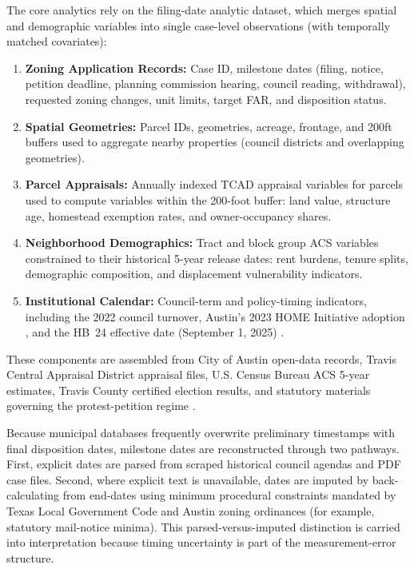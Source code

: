 \documentclass[11pt, letterpaper]{article}
\begin{document}
The core analytics rely on the filing-date analytic dataset, which merges spatial and demographic variables into single case-level observations (with temporally matched covariates):
\begin{enumerate}
    \item \textbf{Zoning Application Records:} Case ID, milestone dates (filing, notice, petition deadline, planning commission hearing, council reading, withdrawal), requested zoning changes, unit limits, target FAR, and disposition status.
    \item \textbf{Spatial Geometries:} Parcel IDs, geometries, acreage, frontage, and 200ft buffers used to aggregate nearby properties (council districts and overlapping geometries).
    \item \textbf{Parcel Appraisals:} Annually indexed TCAD appraisal variables for parcels used to compute variables within the 200-foot buffer: land value, structure age, homestead exemption rates, and owner-occupancy shares.
    \item \textbf{Neighborhood Demographics:} Tract and block group ACS variables constrained to their historical 5-year release dates: rent burdens, tenure splits, demographic composition, and displacement vulnerability indicators.
    \item \textbf{Institutional Calendar:} Council-term and policy-timing indicators, including the 2022 council turnover, Austin's 2023 HOME Initiative adoption \cite{pool2023}, and the HB~24 effective date (September 1, 2025) \cite{hb24_2025}.
\end{enumerate}

These components are assembled from City of Austin open-data records, Travis Central Appraisal District appraisal files, U.S. Census Bureau ACS 5-year estimates, Travis County certified election results, and statutory materials governing the protest-petition regime \cite{coadata2024,tcad2025ears,census2023acs,tcclerk2022,texas211006,hb24_2025}.

Because municipal databases frequently overwrite preliminary timestamps with final disposition dates, milestone dates are reconstructed through two pathways. First, explicit dates are parsed from scraped historical council agendas and PDF case files. Second, where explicit text is unavailable, dates are imputed by back-calculating from end-dates using minimum procedural constraints mandated by Texas Local Government Code and Austin zoning ordinances (for example, statutory mail-notice minima). This parsed-versus-imputed distinction is carried into interpretation because timing uncertainty is part of the measurement-error structure.
\end{document}
